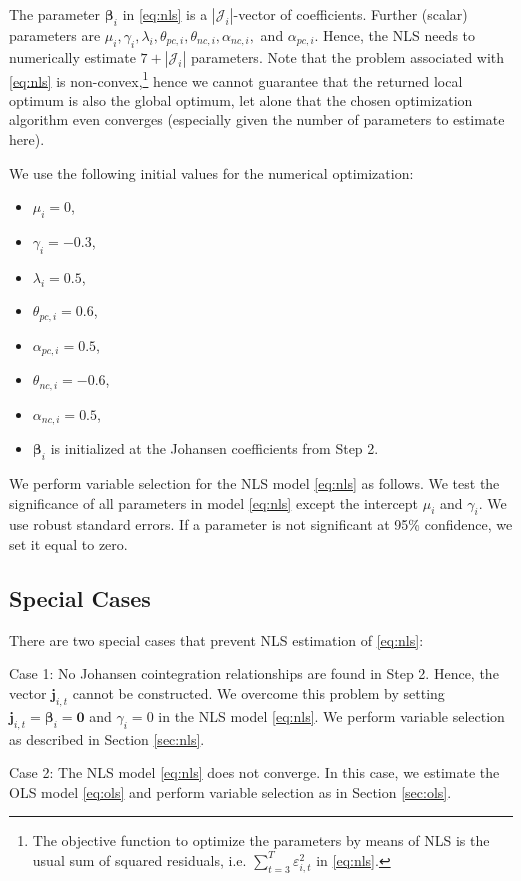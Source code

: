 \documentclass{article}
\begin{document}
The parameter $\bm{\beta}_i$ in \eqref{eq:nls} is a $|\mathcal{J}_i|$-vector of coefficients. Further (scalar) parameters are $\mu_i, \gamma_i, \lambda_i, \theta_{pc,i}, \theta_{nc,i}, \alpha_{nc,i},$ and $\alpha_{pc,i}$. Hence, the NLS needs to numerically estimate $7 + |\mathcal{J}_i|$ parameters. Note that the problem associated with \eqref{eq:nls} is non-convex,\footnote{The objective function to optimize the parameters by means of NLS is the usual sum of squared residuals, i.e. $\sum_{t=3}^T \varepsilon_{i,t}^2$ in \eqref{eq:nls}.} hence we cannot guarantee that the returned local optimum is also the global optimum, let alone that the chosen optimization algorithm even converges (especially given the number of parameters to estimate here).

We use the following initial values for the numerical optimization:
\begin{itemize}
    \item $\mu_i = 0$,
    \item $\gamma_i = -0.3$,
    \item $\lambda_i = 0.5$,
    \item $\theta_{pc,i} = 0.6$,
    \item $\alpha_{pc,i} = 0.5$,
    \item $\theta_{nc,i} = -0.6$,
    \item $\alpha_{nc,i} = 0.5$,
    \item $\bm{\beta}_i$ is initialized at the Johansen coefficients from Step 2.
\end{itemize}

We perform variable selection for the NLS model \eqref{eq:nls} as follows. We test the significance of all parameters in model \eqref{eq:nls} except the intercept $\mu_i$ and $\gamma_i$. We use robust standard errors. If a parameter is not significant at 95\% confidence, we set it equal to zero.

\subsection{Special Cases}
There are two special cases that prevent NLS estimation of \eqref{eq:nls}:

Case 1: No Johansen cointegration relationships are found in Step 2. Hence, the vector $\mathbf{j}_{i,t}$ cannot be constructed. We overcome this problem by setting $\mathbf{j}_{i,t} = \bm{\beta}_i = \mathbf{0}$ and $\gamma_i = 0$ in the NLS model \eqref{eq:nls}. We perform variable selection as described in Section \ref{sec:nls}.

Case 2: The NLS model \eqref{eq:nls} does not converge. In this case, we estimate the OLS model \eqref{eq:ols} and perform variable selection as in Section \ref{sec:ols}.
\end{document}
